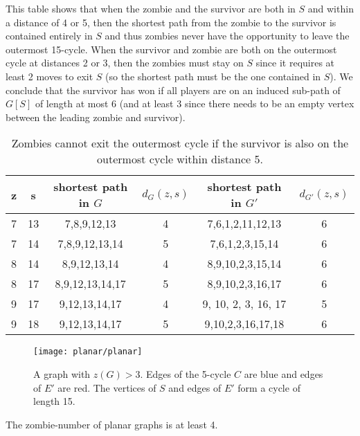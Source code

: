 This table shows that when the zombie and the survivor are both in $S$ and within a distance of 4 or 5, then the shortest path from the zombie to the survivor is contained entirely in $S$ and thus zombies never have the opportunity to leave the outermost 15-cycle.
When the survivor and zombie are both on the outermost cycle at distances 2 or 3, then the zombies must stay on $S$ since it requires at least 2 moves to exit $S$ (so the shortest path must be the one contained in $S$). We conclude that the survivor has won if all players are on an induced sub-path of $G[S]$ of length at most 6 (and at least 3 since there needs to be an empty vertex between the leading zombie and survivor).

\begin{table}
\centering
\begin{tabular}{c | c | c | c | c | c}
z & s & shortest path in $G$ & $d_{G}(z,s)$ & shortest path in $G'$ & $d_{G'}(z,s)$  \\
\hline
7 & 13 & 7,8,9,12,13 & 4 & 7,6,1,2,11,12,13 & 6 \\
7 & 14 & 7,8,9,12,13,14 & 5 & 7,6,1,2,3,15,14 & 6 \\
8 & 14 & 8,9,12,13,14 & 4 & 8,9,10,2,3,15,14 & 6 \\
8 & 17 & 8,9,12,13,14,17 & 5 & 8,9,10,2,3,16,17 & 6 \\
9 & 17 & 9,12,13,14,17 & 4 & 9, 10, 2, 3, 16, 17 & 5 \\
9 & 18 & 9,12,13,14,17 & 5 & 9,10,2,3,16,17,18 & 6 \\
\end{tabular}
\caption{Zombies cannot exit the outermost cycle if the survivor is also on the outermost cycle within distance 5.\label{table outermost cycle}}
\end{table}

\begin{figure}
\centering
\texttt{[image: planar/planar]}
\caption{A graph with $z(G) > 3$. Edges of the 5-cycle $C$ are blue and edges of $E'$ are red. The vertices of $S$ and edges of $E'$ form a cycle of length 15. \label{fig:planar}}
\end{figure}

\begin{theorem}
  The zombie-number of planar graphs is at least 4. \label{thm planar zombies}
\end{theorem}

